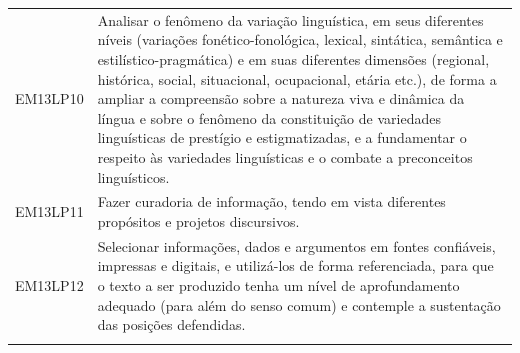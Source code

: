 \documentclass[12pt]{extarticle}
\begin{document}
\begin{longtable}{ll}
EM13LP10   & Analisar o fenômeno da variação linguística, em seus diferentes níveis (variações fonético-fonológica, lexical, sintática, semântica e estilístico-pragmática) e em suas diferentes dimensões (regional, histórica, social, situacional, ocupacional, etária etc.), de forma a ampliar a compreensão sobre a natureza viva e dinâmica da língua e sobre o fenômeno da constituição de variedades linguísticas de prestígio e estigmatizadas, e a fundamentar o respeito às variedades linguísticas e o combate a preconceitos linguísticos.                                                                                                                                                                                                                                                                           \\
\rowcolor[HTML]{E0F7FA} 
EM13LP11   & Fazer curadoria de informação, tendo em vista diferentes propósitos e projetos discursivos.                                                                                                                                                                                                                                                                                                                                                                                                                                                                                                                                                                                                                                                                                                                           \\
\rowcolor[HTML]{FFF} 
EM13LP12   & Selecionar informações, dados e argumentos em fontes confiáveis, impressas e digitais, e utilizá-los de forma referenciada, para que o texto a ser produzido tenha um nível de aprofundamento adequado (para além do senso comum) e contemple a sustentação das posições defendidas.                                                                                                                                                                                                                                                                                                                                                                                                                                                                                                                                  \\
\rowcolor[HTML]{E0F7FA} 

\end{longtable}
\end{document}
